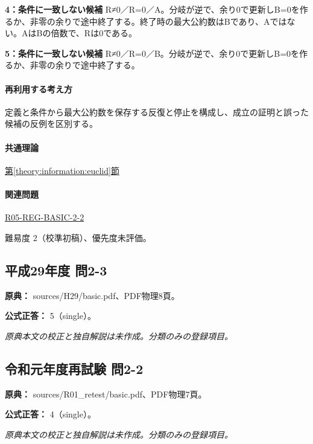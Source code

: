 \noindent\textbf{4：条件に一致しない候補} R≠0／R=\allowbreak{}0／A。分岐が逆で、余り0で更新しB=\allowbreak{}0を作るか、非零の余りで途中終了する。終了時の最大公約数はBであり、Aではない。AはBの倍数で、Rは0である。\par

\noindent\textbf{5：条件に一致しない候補} R≠0／R=\allowbreak{}0／B。分岐が逆で、余り0で更新しB=\allowbreak{}0を作るか、非零の余りで途中終了する。\par

\paragraph{再利用する考え方} 定義と条件から最大公約数を保存する反復と停止を構成し、成立の証明と誤った候補の反例を区別する。

\paragraph{共通理論} \hyperref[theory:information:euclid]{第\ref*{theory:information:euclid}節}

\paragraph{関連問題} \hyperref[q:r05-reg-basic-2-2]{R05-REG-BASIC-2-2}

\par 難易度 2（校準初稿）、優先度未評価。

\subsection{平成29年度 問2-3}
\label{q:h29-reg-basic-2-3}

\noindent\textbf{原典：} sources/H29/basic.pdf、PDF物理8頁。

\textbf{公式正答：} 5（single）。

\par\textit{原典本文の校正と独自解説は未作成。分類のみの登録項目。}

\subsection{令和元年度再試験 問2-2}
\label{q:r01-ret-basic-2-2}

\noindent\textbf{原典：} sources/R01\_retest/basic.pdf、PDF物理7頁。

\textbf{公式正答：} 4（single）。

\par\textit{原典本文の校正と独自解説は未作成。分類のみの登録項目。}

